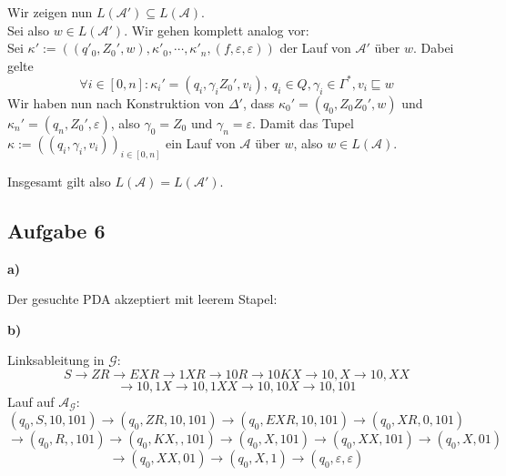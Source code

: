 \documentclass[a4paper,graphics,11pt]{article}
\newcommand{\aufgabe}[1]{\subsection*{Aufgabe #1}}
\begin{document}
Wir zeigen nun $L(\mathcal{A}') \subseteq L(\mathcal{A})$.\\
Sei also $w \in L(\mathcal{A}')$. Wir gehen komplett analog vor:\\
Sei $\kappa' := ((q'_0, Z_0', w), \kappa'_0, \cdots, \kappa'_n, (f, \varepsilon, \varepsilon))$
der Lauf von $\mathcal{A}'$ über $w$. Dabei gelte
$$
    \forall i \in [0,n] : \kappa_i' = (q_i, \gamma_iZ_0', v_i),\ q_i \in Q, \gamma_i \in \Gamma^*, v_i \sqsubseteq w
$$
Wir haben nun nach Konstruktion von $\Delta'$, dass $\kappa_0' = (q_0, Z_0Z_0', w)$ und
$\kappa_n' = (q_n, Z_0', \varepsilon)$, also $\gamma_0 = Z_0$ und $\gamma_n = \varepsilon$.
Damit das Tupel $\kappa := ((q_i, \gamma_i, v_i))_{i \in [0,n]}$ ein Lauf von $\mathcal{A}$ über $w$,
also $w \in L(\mathcal{A})$.

Insgesamt gilt also $L(\mathcal{A}) = L(\mathcal{A}')$.


\newpage

\aufgabe{6}
\textbf{a)}

Der gesuchte PDA akzeptiert mit leerem Stapel:
\begin{center}
\end{center}

\textbf{b)}

Linksableitung in $\mathcal{G}:$
$$
    S \to ZR \to EXR \to 1XR \to 10R \to 10KX \to 10,X \to 10,XX
$$$$
    \to 10,1X \to 10,1XX \to 10,10X \to 10,101
$$
Lauf auf $\mathcal{A}_\mathcal{G}:$
$$
    (q_0, S, 10,101) \to
    (q_0, ZR, 10,101) \to
    (q_0, EXR, 10,101) \to
    (q_0, XR, 0,101)
$$$$
    \to (q_0, R, ,101)
    \to (q_0, KX, ,101)
    \to (q_0, X, 101)
    \to (q_0, XX, 101)
    \to (q_0, X, 01)
$$$$
    \to (q_0, XX, 01)
    \to (q_0, X, 1)
    \to (q_0, \varepsilon, \varepsilon)
$$
\end{document}
